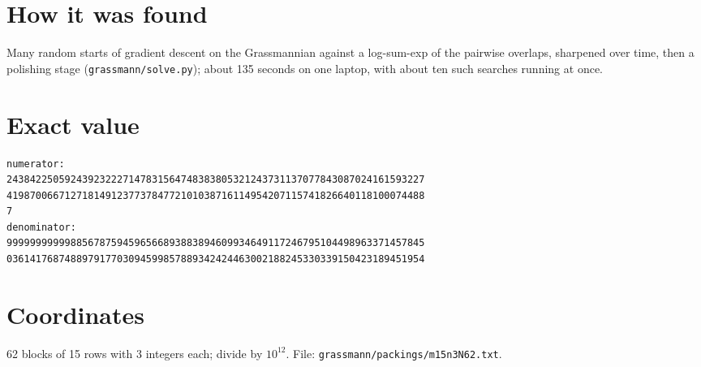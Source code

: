 \documentclass[11pt,a4paper]{article}
\begin{document}
\section{How it was found}
Many random starts of gradient descent on the Grassmannian against a log-sum-exp of the pairwise overlaps, sharpened over time, then a polishing stage (\texttt{grassmann/solve.py}); about 135 seconds on one laptop, with about ten such searches running at once.


\appendix
\section{Exact value}
{\small
\begin{verbatim}
numerator:
243842250592439232227147831564748383805321243731137077843087024161593227
419870066712718149123773784772101038716114954207115741826640118100074488
7
denominator:
999999999998856787594596566893883894609934649117246795104498963371457845
036141768748897917703094599857889342424463002188245330339150423189451954
\end{verbatim}}

\section{Coordinates}
62 blocks of 15 rows with 3 integers each; divide by $10^{12}$. File: \texttt{grassmann/packings/m15n3N62.txt}.
{\tiny
\begin{multicols}{3}
\end{multicols}}
\end{document}
